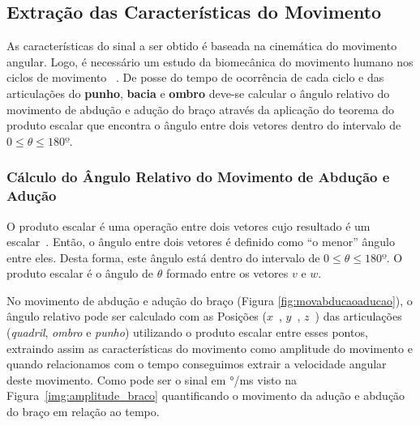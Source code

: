 \subsection{Extração das Características do Movimento} \label{sec:extracao_caracteristcas}
As características do sinal a ser obtido é baseada na cinemática do movimento angular. Logo, é necessário um estudo da biomecânica do movimento humano nos ciclos de movimento ~\cite{hamill1999bases}. De posse do tempo de ocorrência de cada ciclo e das articulações do \textbf{punho}, \textbf{bacia} e \textbf{ombro} deve-se calcular o ângulo relativo do movimento de abdução e adução do braço através da aplicação do teorema do produto escalar que encontra o ângulo entre dois vetores dentro do intervalo de $0 \leq \theta \leq 180º$.

\subsubsection{Cálculo do Ângulo Relativo do Movimento de Abdução e Adução}\label{section:movimento_abducao}
O produto escalar é uma operação entre dois vetores cujo resultado é um escalar~\cite{algebra90}. Então, o ângulo entre dois vetores é definido como ``o menor'' ângulo entre eles. Desta forma, este ângulo está dentro do intervalo de $0 \leq \theta \leq 180º $. O produto escalar é o ângulo de $ \theta$ formado entre os vetores $ v $ e $ w $.


% 
% 

No movimento de abdução e adução do braço (Figura \ref{fig:movabducaoaducao}), o ângulo relativo pode ser calculado com as Posições ($ x $\ ,  $ y $\ , $ z $\ ) das articulações (\textit{quadril}, \textit{ombro} e \textit{punho}) utilizando o produto escalar entre esses pontos, extraindo assim as características do movimento como amplitude do movimento e quando relacionamos com o tempo conseguimos extrair a velocidade angular deste movimento. Como pode ser o sinal em °/ms visto na Figura~\ref{img:amplitude_braco} quantificando o movimento da adução e abdução do braço em relação ao tempo.

